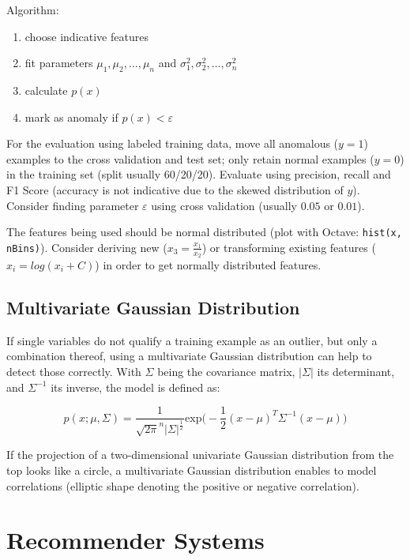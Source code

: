 \documentclass[a4paper,11pt]{scrartcl}
\begin{document}
Algorithm:

\begin{enumerate}
    \item choose indicative features
    \item fit parameters $\mu_1,\mu_2,\dots,\mu_n$ and  $\sigma_1^2,\sigma_2^2,\dots,\sigma_n^2$
    \item calculate $p(x)$
    \item mark as anomaly if $p(x) <  \varepsilon$
\end{enumerate}

For the evaluation using labeled training data, move all anomalous ($y=1$) examples to the cross validation and test set; only retain normal examples ($y=0$) in the training set (split usually 60/20/20). Evaluate using precision, recall and F1 Score (accuracy is not indicative due to the skewed distribution of $y$). Consider finding parameter $\varepsilon$ using cross validation (usually $0.05$ or $0.01$).

The features being used should be normal distributed (plot with Octave: \texttt{hist(x, nBins)}). Consider deriving new ($x_3 = \frac{x_1}{x_2}$) or transforming existing features ($x_i = log(x_i + C)$) in order to get normally distributed features.

\subsection{Multivariate Gaussian Distribution}

If single variables do not qualify a training example as an outlier, but only a combination thereof, using a multivariate Gaussian distribution can help to detect those correctly. With $\Sigma$ being the covariance matrix, $|\Sigma|$ its determinant, and $\Sigma^{-1}$ its inverse, the model is defined as:

$$ p(x;\mu,\Sigma) = \frac{1}{\sqrt{2\pi}^n |\Sigma|^{\frac{1}{2}}} \text{exp} \Bigg( - \frac{1}{2} (x-\mu)^T \Sigma^{-1}(x-\mu) \Bigg) $$

If the projection of a two-dimensional univariate Gaussian distribution from the top looks like a circle, a multivariate Gaussian distribution enables to model correlations (elliptic shape denoting the positive or negative correlation).

\section{Recommender Systems}
\end{document}
